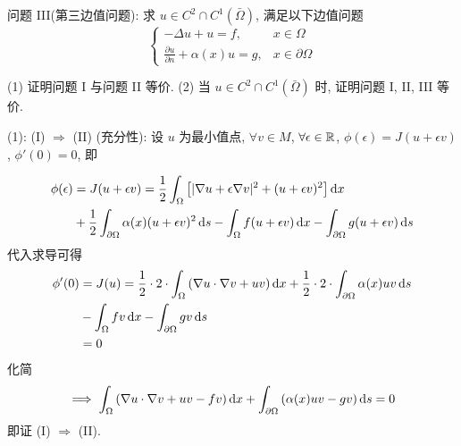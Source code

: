 问题 III(第三边值问题): 求 $u \in C^2 \cap C^1(\bar \Omega)$, 满足以下边值问题
\[ \begin{cases}
- \Delta u + u = f, & x \in \Omega \\
\frac{\partial u}{\partial n} + \alpha (x) u = g, & x \in \partial \Omega
\end{cases} \]

(1) 证明问题 I 与问题 II 等价.
(2) 当 $u \in C^2 \cap C^1(\bar \Omega)$ 时, 证明问题 I, II, III 等价.

\begin{solproof}
(1): (I) $\Rightarrow$ (II) (充分性):
设 $u$ 为最小值点, $\forall v \in M$, $\forall \epsilon \in {\mathbb R}$,
$\phi(\epsilon) = J(u + \epsilon v)$, $\phi'(0) = 0$, 即

\[ \begin{aligned}
\phi(\epsilon) &= J(u + \epsilon v) = \frac12 \int_\Omega 
  \left[ |\nabla u + \epsilon \nabla v|^2 + (u + \epsilon v)^2 \right]
  \operatorname{d\!} x \\
&+ \frac12 \int_{\partial\Omega} \alpha(x) (u + \epsilon v)^2 \operatorname{d\!} s
  - \int_\Omega f(u + \epsilon v) \operatorname{d\!} x
  - \int_{\partial\Omega} g(u + \epsilon v) \operatorname{d\!} s
\end{aligned} \]
代入求导可得
\[ \begin{aligned}
\phi'(0) &= J(u) = \frac12\cdot 2\cdot \int_\Omega
    \left( \nabla u \cdot \nabla v + uv \right) \operatorname{d\!} x
  + \frac12\cdot 2\cdot \int_{\partial\Omega} \alpha(x)uv \operatorname{d\!} s \\
&- \int_\Omega fv\operatorname{d\!} x - \int_{\partial\Omega} gv\operatorname{d\!} s \\
&= 0
\end{aligned} \]
化简
\[ \implies
\int_\Omega \left( \nabla u \cdot \nabla v + uv -fv \right) \operatorname{d\!} x
+ \int_{\partial\Omega} \left( \alpha(x)uv - gv \right) \operatorname{d\!} s = 0
\]
即证 (I) $\Rightarrow$ (II).


\end{solproof}
